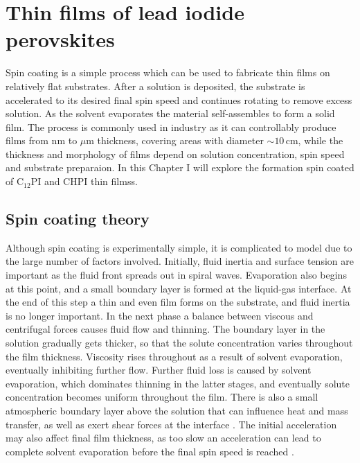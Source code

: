 
\chapter{Thin films of lead iodide perovskites}

\graphicspath{{Chapter4/Figures/}}

Spin coating is a simple process which can be used to fabricate thin films on relatively flat substrates. After a solution is deposited, the substrate is accelerated to its desired final spin speed and continues rotating to remove excess solution. As the solvent evaporates the material self-assembles to form a solid film. The process is commonly used in industry as it can controllably produce films from nm to $\mu$m thickness, covering areas with diameter $\sim10$\,cm, while the thickness and morphology of films depend on solution concentration, spin speed and substrate preparaion. In this Chapter I will explore the formation spin coated of C$_{12}$PI and CHPI thin filmss.

\section{Spin coating theory}
Although spin coating is experimentally simple, it is complicated to model due to the large number of factors involved. Initially, fluid inertia and surface tension are important as the fluid front spreads out in spiral waves. Evaporation also begins at this point, and a small boundary layer is formed at the liquid-gas interface. At the end of this step a thin and even film forms on the substrate, and fluid inertia is no longer important. In the next phase a balance between viscous and centrifugal forces causes fluid flow and thinning. The boundary layer in the solution gradually gets thicker, so that the solute concentration varies throughout the film thickness. Viscosity rises throughout as a result of solvent evaporation, eventually inhibiting further flow. Further fluid loss is caused by solvent evaporation, which dominates thinning in the latter stages, and eventually solute concentration becomes uniform throughout the film. There is also a small atmospheric boundary layer above the solution that can influence heat and mass transfer, as well as exert shear forces at the interface \cite{Meyerhofer1978, VanHardeveld1995, Lawrence1988}. The initial acceleration may also affect final film thickness, as too slow an acceleration can lead to complete solvent evaporation before the final spin speed is reached \cite{Birnie2005}.

